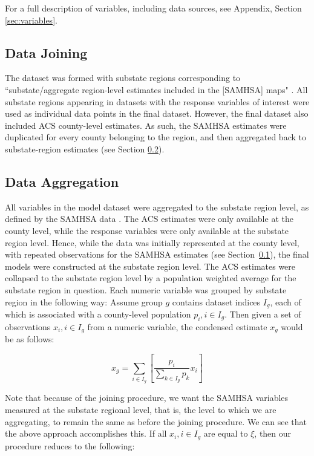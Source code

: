 \documentclass{article}
\begin{document}
For a full description of variables, including data sources, see
Appendix, Section \ref{sec:variables}.

\subsection{Data Joining}\label{sec:joining}

The dataset was formed with substate regions corresponding to
``substate/aggregate region-level estimates included in the [SAMHSA] maps"
\cite{samhsa_data}. All substate regions appearing in datasets with the response
variables of interest were used as individual data points in the final dataset.
However, the final dataset also included ACS county-level estimates. As such,
the SAMHSA estimates were duplicated for every county belonging to the region,
and then aggregated back to substate-region estimates (see Section
\ref{sec:aggregation}).

\subsection{Data Aggregation}\label{sec:aggregation}

All variables in the model dataset were aggregated to the substate region level,
as defined by the SAMHSA data \cite{samhsa_substate_region_defs}.
The ACS estimates were only available at the county level,
while the response variables were only available at the substate region level.
Hence, while the data was initially represented at the county level,
with repeated observations for the SAMHSA estimates
(see Section~\ref{sec:joining}),
the final models were constructed at the substate region level.
The ACS estimates were collapsed to the substate region level
by a population weighted average for the substate region in question.
Each numeric variable was grouped by substate region
in the following way:
Assume group $g$ contains dataset indices $I_g$,
each of which is associated with a county-level population
$p_{i}, i \in I_g$.
Then given a set of observations $x_{i}, i \in I_g$
from a numeric variable,
the condensed estimate $x_g$ would be as follows:

\begin{equation*}
    x_g = \sum_{i \in I_g}
    \left[ \frac{p_{i}}{\sum_{k \in I_g} p_{k}} x_i \right]
\end{equation*}

Note that because of the joining procedure,
we want the SAMHSA variables measured at the substate regional level,
that is, the level to which we are aggregating,
to remain the same as before the joining procedure.
We can see that the above approach accomplishes this.
If all $x_i, i \in I_g$ are equal to $\xi$,
then our procedure reduces to the following:
\end{document}
